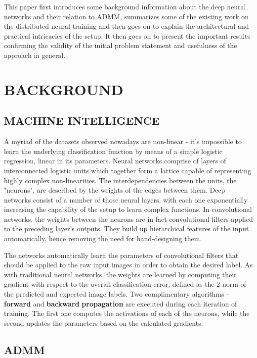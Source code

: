 \documentclass[letterpaper]{article}
\begin{document}
This paper first introduces some background information about the deep neural networks and their relation to ADMM, summarizes some of the existing work on the distributed neural training and then goes on to explain the architectural and practical intricacies of the setup. It then goes on to present the important results confirming the validity of the initial problem statement and usefulness of the approach in general.
\section{BACKGROUND}

\subsection{MACHINE INTELLIGENCE}

A myriad of the datasets observed nowadays are non-linear - it's impossible to learn the underlying classification function by means of a simple logistic regression, linear in its parameters. Neural networks comprise of layers of interconnected logistic units which together form a lattice capable of representing highly complex non-linearities. The interdependencies between the units, the "neurons", are described by the weights of the edges between them. Deep networks consist of a number of those neural layers, with each one exponentially increasing the capability of the setup to learn complex functions. In convolutional networks, the weights between the neurons are in fact convolutional filters applied to the preceding layer's outputs. They build up hierarchical features of the input automatically, hence removing the need for hand-designing them. 

The networks automatically learn the parameters of convolutional filters that should be applied to the raw input images in order to obtain the desired label. As with traditional neural networks, the weights are learned by computing their gradient with respect to the overall classification error, defined as the 2-norm of the predicted and expected image labels. Two complimentary algorithms -  \textbf{forward} and \textbf{backward} \textbf{propagation} are executed during each iteration of training. The first one computes the activations of each of the neurons, while the second updates the parameters based on the calculated gradients.

\subsection{ADMM}
\end{document}
